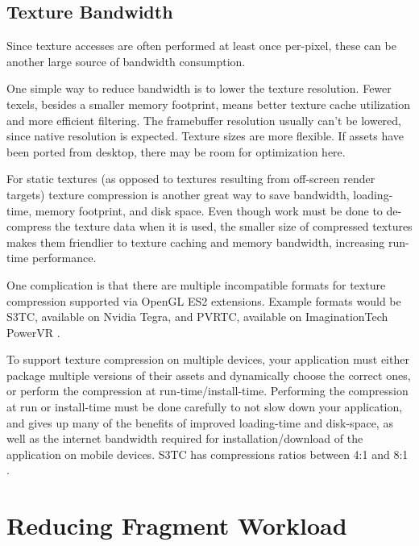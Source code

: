 \subsection{Texture Bandwidth}\label{JonMcCaffrey-Texture-Bandwidth}
Since texture accesses are often performed at least once per-pixel, these can be another large source of bandwidth consumption.


One simple way to reduce bandwidth is to lower the texture resolution.  Fewer texels, besides a smaller memory footprint, means better texture cache utilization and more efficient filtering.  The framebuffer resolution usually can't be lowered, since native resolution is expected.  Texture sizes are more flexible.  If assets have been ported from desktop, there may be room for optimization here.


For static textures (as opposed to textures resulting from off-screen render
targets) texture compression is another great way to save bandwidth,
loading-time, memory footprint, and disk space.  Even though work must be
done to de-compress the texture data when it is used, the smaller size of
compressed textures makes them friendlier to texture caching and memory
bandwidth, increasing run-time performance. 

One complication is that there are multiple incompatible formats for texture
compression supported via OpenGL ES2 extensions.  Example formats would be S3TC, available on Nvidia Tegra, and PVRTC, available on ImaginationTech PowerVR \cite{motorola_texture}.

To support texture compression on multiple devices, your application must
either package multiple versions of their assets and dynamically choose the
correct ones, or perform the compression at run-time/install-time.  Performing
the compression at run or install-time must be done carefully to not slow down
your application, and gives up many of the benefits of improved loading-time
and disk-space, as well as the internet bandwidth required for
installation/download of the application on mobile devices.  S3TC has
compressions ratios between 4:1 and 8:1 \cite{arb_texture_compresssion}.

\section{Reducing Fragment Workload}
\label{Jon-McCaffrey-Reducing-Fragment-Workload}

